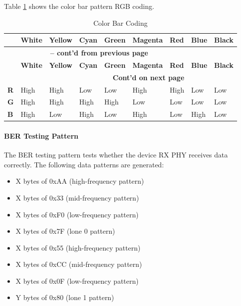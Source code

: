 \documentclass[main\_\_EN.tex]{subfiles}
\begin{document}
Table \ref{tab:color-bar-coding} shows the color bar pattern RGB coding.
\begin{longtable}[c]{ |p{0.5cm}|p{1.5cm}|p{1.5cm}|p{1.5cm}|p{1.5cm}|p{1.5cm}|p{1.5cm}|p{1.5cm}|p{1.5cm}| }
    \caption{Color Bar Coding}
    \label{tab:color-bar-coding}\\\hline

    \rowcolor{lightgray}
     & \textbf{White} & \textbf{Yellow} & \textbf{Cyan} & \textbf{Green} & \textbf{Magenta} & \textbf{Red} & \textbf{Blue} & \textbf{Black}  \\\hline
    \endfirsthead


    \multicolumn{7}{c}{\bfseries \tablename\ \thetable{} -- cont'd from previous page}\\\hline
    \rowcolor{lightgray}
    & \textbf{White} & \textbf{Yellow} & \textbf{Cyan} & \textbf{Green} & \textbf{Magenta} & \textbf{Red} & \textbf{Blue} & \textbf{Black}  \\\hline
    \endhead

    \multicolumn{7}{r}{\textbf{Cont'd on next page}} \\
    \endfoot

    \endlastfoot
        
        \textbf{R} & High & High & Low  & Low  & High & High & Low  & Low \\\hline
        \textbf{G} & High & High & High & High & Low  & Low  & Low  & Low \\\hline
        \textbf{B} & High & Low  & High & Low  & High & Low  & High & Low \\\hline

\end{longtable}

\paragraph{BER Testing Pattern}
The BER testing pattern tests whether the device RX PHY receives data correctly. The following data patterns are generated:
\begin{itemize}
    \item X bytes of 0xAA (high-frequency pattern)
    \item X bytes of 0x33 (mid-frequency pattern)
    \item X bytes of 0xF0 (low-frequency pattern)
    \item X bytes of 0x7F (lone 0 pattern)
    \item X bytes of 0x55 (high-frequency pattern)
    \item X bytes of 0xCC (mid-frequency pattern)
    \item X bytes of 0x0F (low-frequency pattern)
    \item Y bytes of 0x80 (lone 1 pattern)
\end{itemize}
\end{document}
